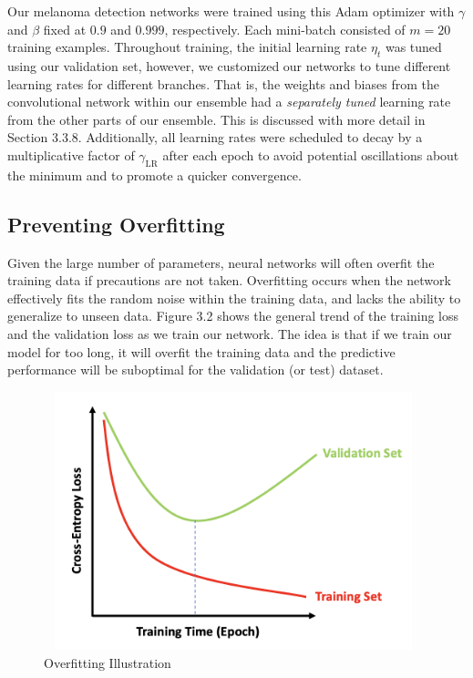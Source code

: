 \documentclass [MAS] {uclathes}
\begin{document}
Our melanoma detection networks were trained using this Adam optimizer with $\gamma$ and $\beta$ fixed at $0.9$ and $0.999$, respectively. Each mini-batch consisted of $m=20$ training examples.  Throughout training, the initial learning rate $\eta_t$ was tuned using our validation set, however, we customized our networks to tune different learning rates for different branches. That is, the weights and biases from the convolutional network within our ensemble had a \textit{separately tuned} learning rate from the other parts of our ensemble. This is discussed with more detail in Section 3.3.8. Additionally, all learning rates were scheduled to decay by a multiplicative factor of $\gamma_{\text{LR}}$ after each epoch to avoid potential oscillations about the minimum and to promote a quicker convergence.

\subsection{Preventing Overfitting}

Given the large number of parameters, neural networks will often overfit the training data if precautions are not taken. Overfitting occurs when the network effectively fits the random noise within the training data, and lacks the ability to generalize to unseen data. Figure 3.2 shows the general trend of the training loss and the validation loss as we train our network. The idea is that if we train our model for too long, it will overfit the training data and the predictive performance will be suboptimal for the validation (or test) dataset. 

\begin{figure}[h]
\centering
\includegraphics[height = 75mm, width=110mm]{imgs/overfitting.png}
\caption{Overfitting Illustration}
\label{fig:ovfit}
\end{figure}
\end{document}
